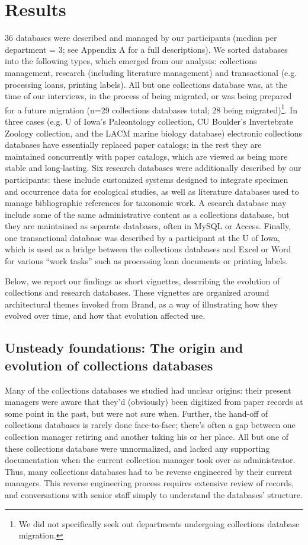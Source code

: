 \section{Results}

36 databases were described and managed by our participants (median per department = 3; see Appendix A for a full descriptions). We sorted databases into the following types, which emerged from our analysis: collections management, research (including literature management) and transactional (e.g. processing loans, printing labels). All but one collections database was, at the time of our interviews, in the process of being migrated, or was being prepared for a future migration (n=29 collections databases total; 28 being migrated)\footnote{We did not specifically seek out departments undergoing collections database migration.}. In three cases (e.g. U of Iowa’s Paleontology collection, CU Boulder’s Invertebrate Zoology collection, and the LACM marine biology database) electronic collections databases have essentially replaced paper catalogs; in the rest they are maintained concurrently with paper catalogs, which are viewed as being more stable and long-lasting. Six research databases were additionally described by our participants: these include customized systems designed to integrate specimen and occurrence data for ecological studies, as well as literature databases used to manage bibliographic references for taxonomic work. A esearch database may include some of the same administrative content as a collections database, but they are maintained as separate databases, often in MySQL or Access. Finally, one transactional database was described by a participant at the U of Iowa, which is used as a bridge between the collections databases and Excel or Word for various “work tasks” such as processing loan documents or printing labels. 

Below, we report our findings as short vignettes, describing the evolution of collections and research databases. These vignettes are organized around architectural themes invoked from Brand, as a way of illustrating how they evolved over time, and how that evolution affected use.

\subsection{Unsteady foundations: The origin and evolution of collections databases}

Many of the collections databases we studied had unclear origins: their present managers were aware that they'd (obviously) been digitized from paper records at some point in the past, but were not sure when. Further, the hand-off of collections databases is rarely done face-to-face; there's often a gap between one collection manager retiring and another taking his or her place. All but one of these collections database were unnormalized, and lacked any supporting documentation when the current collection manager took over as administrator. Thus, many collections databases had to be reverse engineered by their current managers. This reverse engineering process requires extensive review of records, and conversations with senior staff simply to understand the databases’ structure. 

